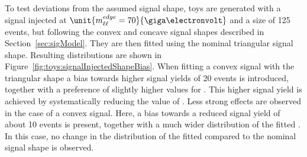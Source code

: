 To test deviations from the assumed signal shape, toys are generated with a signal injected at $\unit{\mlledge = 70}{\giga\electronvolt}$ and a size of 125 events, but following the convex and concave signal shapes described in Section~\ref{sec:sigModel}. They are then fitted using the nominal triangular signal shape. Resulting distributions are shown in Figure~\ref{fig:toys:signalInjectedShapeBias}. When fitting a convex signal with the triangular shape a bias towards higher signal yields of 20 events is introduced, together with a preference of slightly higher values for \mlledge. This higher signal yield is achieved by systematically reducing the value of \Rsfof. Less strong effects are observed in the case of a convex signal. Here, a bias towards a reduced signal yield of about 10 events is present, together with a much wider distribution of the fitted \mlledge. In this case, no change in the distribution of the fitted \Rsfof compared to the nominal signal shape is observed. 


